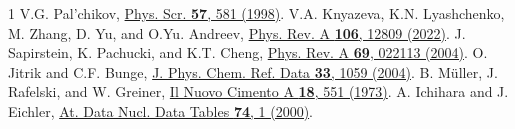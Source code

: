\documentclass[11pt,a4paper]{article}
\begin{document}
\begin{thebibliography}{1}
   V.G. Pal’chikov,  \href{https://doi.org/10.1088/0031-8949/57/5/006}{Phys. Scr. {\bf 57}, 581 (1998)}.
   V.A. Knyazeva, K.N. Lyashchenko, M. Zhang, D. Yu, and O.Yu. Andreev, \href{https://doi.org/10.1103/PhysRevA.106.012809}{Phys. Rev. A {\bf 106}, 12809 (2022)}.
   J. Sapirstein, K. Pachucki, and K.T. Cheng, \href{https://doi.org/10.1103/PhysRevA.69.022113}{Phys. Rev. A {\bf 69}, 022113 (2004)}.
   O. Jitrik and C.F. Bunge, \href{https://doi.org/10.1063/1.1796671}{J. Phys. Chem. Ref. Data {\bf 33}, 1059 (2004)}.
    B. Müller, J. Rafelski, and W. Greiner, \href{https://doi.org/10.1007/BF02722798}{Il Nuovo Cimento A {\bf 18}, 551 (1973)}.
   A. Ichihara and J. Eichler, \href{https://doi.org/10.1006/adnd.1999.0825}{At. Data Nucl. Data Tables {\bf 74}, 1 (2000)}.
\end{thebibliography}
\end{document}
